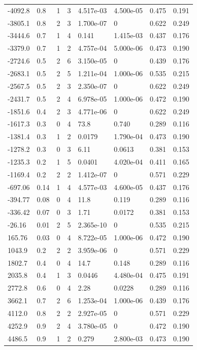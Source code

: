 \documentclass[preview]{standalone}
\begin{document}
{{\begin{tabular}{L{1.2cm}C{1.2cm} C{0.3cm}C{0.5cm} C{1.4cm}C{1.4cm} C{1.4cm}C{1.4cm}}
  -4092.8  &   0.8  & 1     &  3 &  4.517e-03  & 4.500e-05  & 0.475 &  0.191   \\ 
  -3805.1  &   0.8  & 2     &  3 &  1.700e-07  & 0  & 0.622 &  0.249   \\ 
  -3444.6  &   0.7  & 1     &  4 &  0.141  & 1.415e-03  & 0.437 &  0.176   \\ 
  -3379.0  &   0.7  & 1     &  2 &  4.757e-04  & 5.000e-06  & 0.473 &  0.190   \\ 
  -2724.6  &   0.5  & 2     &  6 &  3.150e-05  & 0  & 0.439 &  0.176   \\ 
  -2683.1  &   0.5  & 2     &  5 &  1.211e-04  & 1.000e-06  & 0.535 &  0.215   \\ 
  -2567.5  &   0.5  & 2     &  3 &  2.350e-07  & 0  & 0.622 &  0.249   \\ 
  -2431.7  &   0.5  & 2     &  4 &  6.978e-05  & 1.000e-06  & 0.472 &  0.190   \\ 
  -1851.6  &   0.4  & 2     &  3 &  4.771e-06  & 0  & 0.622 &  0.249   \\ 
  -1617.3  &   0.3  & 0     &  4 &  73.8  & 0.740  & 0.289 &  0.116   \\ 
  -1381.4  &   0.3  & 1     &  2 &  0.0179  & 1.790e-04  & 0.473 &  0.190   \\ 
  -1278.2  &   0.3  & 0     &  3 &  6.11  & 0.0613  & 0.381 &  0.153   \\ 
  -1235.3  &   0.2  & 1     &  5 &  0.0401  & 4.020e-04  & 0.411 &  0.165   \\ 
  -1169.4  &   0.2  & 2     &  2 &  1.412e-07  & 0  & 0.571 &  0.229   \\ 
  -697.06  &  0.14  & 1     &  4 &  4.577e-03  & 4.600e-05  & 0.437 &  0.176   \\ 
  -394.77  &  0.08  & 0     &  4 &  11.8  & 0.119  & 0.289 &  0.116   \\ 
  -336.42  &  0.07  & 0     &  3 &  1.71  & 0.0172  & 0.381 &  0.153   \\ 
  -26.16  &  0.01  & 2     &  5 &  2.365e-10  & 0  & 0.535 &  0.215   \\ 
  165.76  &  0.03  & 0     &  4 &  8.722e-05  & 1.000e-06  & 0.472 &  0.190   \\ 
  1043.9  &   0.2  & 2     &  2 &  3.959e-06  & 0  & 0.571 &  0.229   \\ 
  1802.7  &   0.4  & 0     &  4 &  14.7  & 0.148  & 0.289 &  0.116   \\ 
  2035.8  &   0.4  & 1     &  3 &  0.0446  & 4.480e-04  & 0.475 &  0.191   \\ 
  2772.8  &   0.6  & 0     &  4 &  2.28  & 0.0228  & 0.289 &  0.116   \\ 
  3662.1  &   0.7  & 2     &  6 &  1.253e-04  & 1.000e-06  & 0.439 &  0.176   \\ 
  4112.0  &   0.8  & 2     &  2 &  2.927e-05  & 0  & 0.571 &  0.229   \\ 
  4252.9  &   0.9  & 2     &  4 &  3.780e-05  & 0  & 0.472 &  0.190   \\ 
  4486.5  &   0.9  & 1     &  2 &  0.279  & 2.800e-03  & 0.473 &  0.190   \\ 
\hline 
\end{tabular} 

}}
\end{document}
